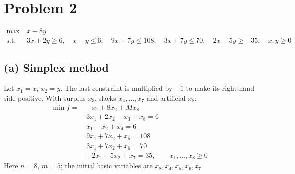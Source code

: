 \documentclass[11pt,a4paper]{article}
\begin{document}
\newpage
\section{Problem 2}
\begin{align*}
\max\ & x-8y\\
\text{s.t. } & 3x+2y\ge 6,\quad x-y\le 6,\quad 9x+7y\le 108,\quad 3x+7y\le 70,\quad 2x-5y\ge -35,\quad x,y\ge 0
\end{align*}

\subsection*{(a) Simplex method}
Let $x_1=x$, $x_2=y$. The last constraint is multiplied by $-1$ to make its right-hand side positive. With surplus $x_3$, slacks $x_4,\dots,x_7$ and artificial $x_8$:
\begin{align*}
\min f=\ & -x_1+8x_2+Mx_8\\
& 3x_1+2x_2-x_3+x_8=6\\
& x_1-x_2+x_4=6\\
& 9x_1+7x_2+x_5=108\\
& 3x_1+7x_2+x_6=70\\
& -2x_1+5x_2+x_7=35,\qquad x_1,\dots,x_8\ge 0
\end{align*}
Here $n=8$, $m=5$; the initial basic variables are $x_8,x_4,x_5,x_6,x_7$.
\end{document}
